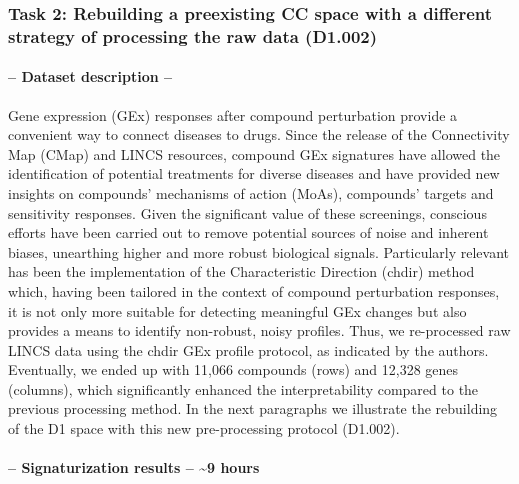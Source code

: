 


\subsubsection{Task 2: Rebuilding a preexisting CC space with a different strategy of processing the raw data (D1.002)}


\paragraph{-- Dataset description --} \leavevmode

Gene expression (GEx) responses after compound perturbation provide a convenient way to connect diseases to drugs. Since the release of the Connectivity Map (CMap) and LINCS resources, compound GEx signatures have allowed the identification of potential treatments for diverse diseases \cite{pauls_identification_2021, sawada_predicting_2018, chen_reversal_2017} and have provided new insights on compounds’ mechanisms of action (MoAs), compounds’ targets and sensitivity responses. Given the significant value of these screenings, conscious efforts have been carried out to remove potential sources of noise and inherent biases, unearthing higher and more robust biological signals. Particularly relevant has been the implementation of the Characteristic Direction (chdir) method\cite{clark_characteristic_2014} which, having been tailored in the context of compound perturbation responses, it is not only more suitable for detecting meaningful GEx changes but also provides a means to identify non-robust, noisy profiles. Thus, we re-processed raw LINCS data using the chdir GEx profile protocol, as indicated by the authors. Eventually, we ended up with 11,066 compounds (rows) and 12,328 genes (columns), which significantly enhanced the interpretability compared to the previous processing method. In the next paragraphs we illustrate the rebuilding of the D1 space with this new pre-processing protocol (D1.002). 

\paragraph{-- Signaturization results -- \textasciitilde9 hours}  \leavevmode

